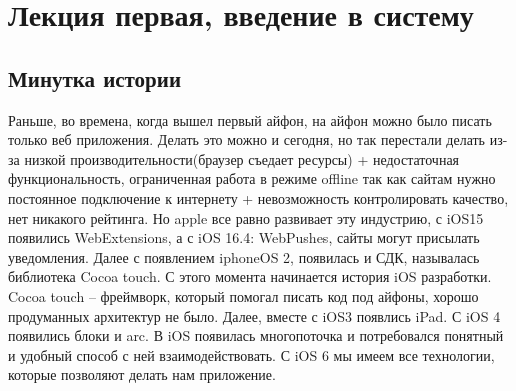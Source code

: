 \documentclass{article}
\begin{document}
    \tableofcontents\pagebreak
    \section{Лекция первая, введение в систему}
    \subsection{Минутка истории}
    Раньше, во времена, когда вышел первый айфон, на айфон можно было писать только веб приложения. Делать это можно и сегодня, но так перестали делать из-за низкой производительности(браузер съедает ресурсы) + недостаточная функциональность, ограниченная работа в режиме offline так как сайтам нужно постоянное подключение к интернету + невозможность контролировать качество, нет никакого рейтинга. 
    \newline
    Но apple все равно развивает эту индустрию, с iOS15 появились WebExtensions, а с iOS 16.4: WebPushes, сайты могут присылать уведомления. 
    \newline
    Далее с появлением iphoneOS 2, появилась и СДК, называлась библиотека Cocoa touch. С этого момента начинается история iOS разработки. Cocoa touch -- фреймворк, который помогал писать код под айфоны, хорошо продуманных архитектур не было. 
    \newline
    Далее, вместе с iOS3 появлись iPad. 
    \newline
    С iOS 4 появились блоки и arc. В iOS появилась многопоточка и потребовался понятный и удобный способ с ней взаимодействовать. 
    \newline
    С iOS 6 мы имеем все технологии, которые позволяют делать нам приложение. 
\end{document}
